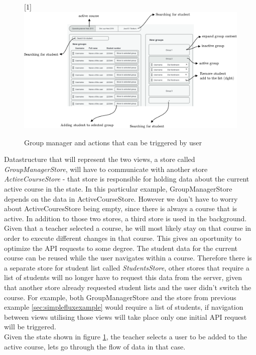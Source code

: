 \begin{figure}[h]
  \scalebox{1}[1]{{\includegraphics[width=1\linewidth]{graphics/advancedgroupmanager.png}}}
  \caption{Group manager and actions that can be triggered by user}
  \label{fig:advancedgroupmanager}
\end{figure}

Datastructure that will represent the two views, a store called \emph{GroupManagerStore}, will have to communicate with another store \emph{ActiveCourseStore} - that store is responsible for holding data about the current active course in the state. In this particular example, GroupManagerStore depends on the data in ActiveCourseStore. However we don't have to worry about ActiveCouresStore being empty, since there is always a course that is active. In addition to those two stores, a third store is used in the background. Given that a teacher selected a course, he will most likely stay on that course in order to execute different changes in that course. This gives an oportunity to optimize the API requests to some degree. The student data for the current course can be reused  while the user navigates within a course. Therefore there is a separate store for student list called \emph{StudentsStore}, other stores that require a list of students will no longer have to request this data from the server, given that another store already requested student lists and the user didn't switch the course. For example, both GroupManagerStore and the store from previous example \ref{sec:simplefluxexample} would require a list of students, if navigation between views utilising those views will take place only one initial API request will be triggered.
\\Given the state shown in figure \ref{fig:advancedgroupmanager}, the teacher selects a user to be added to the active course, lets go through the flow of data in that case.

